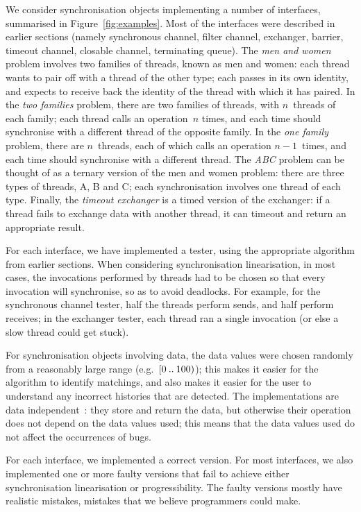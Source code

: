 We consider synchronisation objects implementing a number of interfaces,
summarised in Figure~\ref{fig:examples}.  Most of the interfaces were
described in earlier sections (namely synchronous channel, filter channel,
exchanger, barrier, timeout channel, closable channel, terminating queue).
The \emph{men and women} problem involves two families of threads, known as
men and women: each thread wants to pair off with a thread of the other type;
each passes in its own identity, and expects to receive back the identity of
the thread with which it has paired.  In the \emph{two families} problem,
there are two families of threads, with $n$~threads of each family; each
thread calls an operation~$n$ times, and each time should synchronise with a
different thread of the opposite family.  In the \emph{one family} problem,
there are $n$~threads, each of which calls an operation $n-1$~times, and each
time should synchronise with a different thread.  The \emph{ABC} problem can
be thought of as a ternary version of the men and women problem: there are
three types of threads, A, B and C; each synchronisation involves one thread
of each type.  Finally, the \emph{timeout exchanger} is a timed version of the
exchanger: if a thread fails to exchange data with another thread, it can
timeout and return an appropriate result.

For each interface, we have implemented a tester, using the appropriate
algorithm from earlier sections.  When considering synchronisation
linearisation, in most cases, the invocations performed by threads had to be
chosen so that every invocation will synchronise, so as to avoid deadlocks.
For example, for the synchronous channel tester, half the threads perform
sends, and half perform receives; in the exchanger tester, each thread ran a
single invocation (or else a slow thread could get stuck).

For synchronisation objects involving data, the data values were chosen
randomly from a reasonably large range (e.g.~$[0 \mathbin{..} 100)$); this makes it
easier for the algorithm to identify matchings, and also makes it easier for
the user to understand any incorrect histories that are detected.  The
implementations are data independent~\cite{???}: they store and return the
data, but otherwise their operation does not depend on the data values used;
this means that the data values used do not affect the occurrences of bugs.

For each interface, we implemented a correct version.  For most interfaces, we
also implemented one or more faulty versions that fail to achieve either
synchronisation linearisation or progressibility.  The faulty versions mostly
have realistic mistakes, mistakes that we believe programmers could make.  

